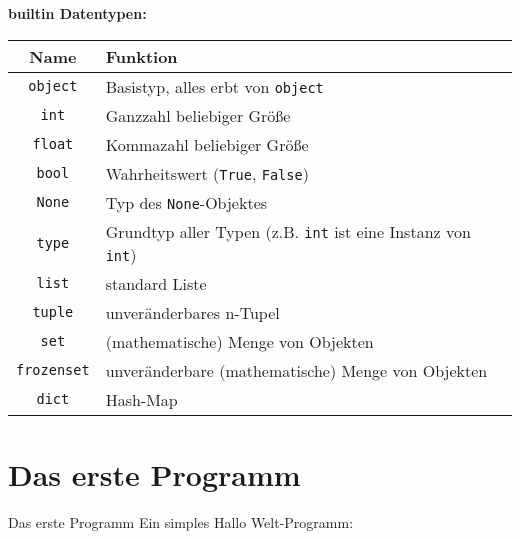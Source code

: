 \begin{frame}[fragile]
	\textbf{builtin Datentypen:}\\
	\begin{tabular}{c|l}
		Name & Funktion \\ \hline
		\texttt{object} & Basistyp, alles erbt von \texttt{object} \\
		\texttt{int} & Ganzzahl \glqq{}beliebiger\grqq{} Grö\ss{}e \\
		\texttt{float} & Kommazahl \glqq{}beliebiger\grqq{} Grö\ss{}e \\
		\texttt{bool} & Wahrheitswert (\texttt{True}, \texttt{False})\\
		\texttt{None} & Typ des \texttt{None}-Objektes \\
		\texttt{type} & Grundtyp aller Typen (z.B. \texttt{int} ist eine Instanz von \texttt{int}) \\
		\texttt{list} & standard Liste \\
		\texttt{tuple} & unveränderbares n-Tupel \\
		\texttt{set} & (mathematische) Menge von Objekten \\
		\texttt{frozenset} & unveränderbare (mathematische) Menge von Objekten \\
		\texttt{dict} & Hash-Map \\
	\end{tabular}
\end{frame}


\section{Das erste Programm}
\begin{frame}[fragile]{Das erste Programm}
	Ein simples \glqq{}Hallo Welt\grqq{}-Programm:\\[.5cm]
	
\end{frame}


